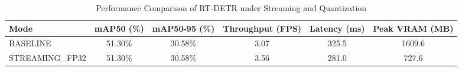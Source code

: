\begin{table}[h]
\centering
\caption{Performance Comparison of RT-DETR under Streaming and Quantization}
\label{tab:air_detr_perf}
\begin{tabular}{|l|c|c|c|c|c|}
\hline
\textbf{Mode} & \textbf{mAP50 (\%)} & \textbf{mAP50-95 (\%)} & \textbf{Throughput (FPS)} & \textbf{Latency (ms)} & \textbf{Peak VRAM (MB)} \\ \hline
BASELINE & 51.30\% & 30.58\% & 3.07 & 325.5 & 1609.6 \\ \hline
STREAMING_FP32 & 51.30\% & 30.58\% & 3.56 & 281.0 & 727.6 \\ \hline
\end{tabular}
\end{table}